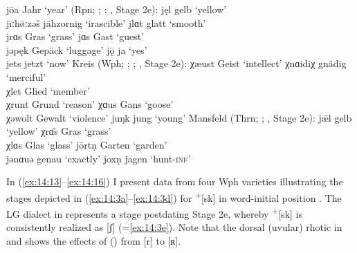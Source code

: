 \ex\label{ex:14:9d} jōa \tab [ʝoːɐ] \tab Jahr \tab ‘year’ 
\z
\ex%
\label{ex:14:10} (Rpn; \citealt{Bubner1935}; ; , Stage 2e):
\ea jęl \tab [ʝɛl] \tab gelb \tab ‘yellow’ \\\label{ex:14:10a}
    jīːh\={ø}ːzəš \tab [ʝiːhøːzəʃ] \tab jähzornig \tab ‘irascible’ 
\ex jlɑt \tab [ʝlɑt] \tab glatt \tab ‘smooth’ \\\label{ex:14:10b}
    jrɑs \tab [ʝrɑs] \tab Gras \tab ‘grass’ 
\ex jɑs \tab [ʝɑs] \tab Gast \tab ‘guest’ \\\label{ex:14:10c}
    jəpęk \tab [ʝəpɛk] \tab Gepäck \tab ‘luggage’ 
\ex jǭ \tab [ʝɔː] \tab ja \tab ‘yes’ \\\label{ex:14:10d}
    jets \tab [ʝets] \tab jetzt \tab ‘now’ 
\z
\ex%
\label{ex:14:11}Kreis  (Wph; \citealt{Hoffmann1887}; ; , Stage 2e):
\ea\label{ex:14:11a} χæust \tab [çæust] \tab Geist \tab ‘intellect’ 
\ex\label{ex:14:11b} χnɑidiχ \tab [çnɑidiç] \tab gnädig \tab ‘merciful’ \\
    χlet \tab [çlet] \tab Glied \tab ‘member’ \\
    χrunt \tab [çʀunt] \tab Grund \tab ‘reason’ 
\ex\label{ex:14:11c} χɑus \tab  [çɑus] \tab Gans \tab ‘goose’ \\
    χəwolt \tab [çəvolt] \tab Gewalt \tab ‘violence’ 
\ex\label{ex:14:11d}  juŋk \tab [ʝuŋk] \tab jung  \tab  ‘young’ 
    \z
\ex%
\label{ex:14:12}Mansfeld (Thrn; \citealt{Hennemann1901}; , Stage 2e):
\ea\label{ex:14:12a} j\={æ}l \tab [ʝæːl] \tab gelb \tab ‘yellow’ 
\ex\label{ex:14:12b} χrɑ̄s \tab [çʀɑːs] \tab Gras \tab ‘grass’ \\
    χlɑs \tab [çlɑt] \tab Glas \tab ‘glass’ 
\ex\label{ex:14:12c} jōrtṇ \tab [ʝoːʀtn̩] \tab Garten \tab ‘garden’ \\
    jənɑuə \tab [ʝənɑuə] \tab genau \tab ‘exactly’ 
\ex\label{ex:14:12d} joxṇ \tab [ʝoxn̩] \tab jagen \tab ‘hunt\textsc{{}-inf}’ 
\z
\z 

In (\ref{ex:14:13}--\ref{ex:14:16}) I present data from four Wph varieties illustrating the stages depicted in (\ref{ex:14:3a}--\ref{ex:14:3d}) for  \textsuperscript{+}[sk] in word-initial position \citep{Hall2021}. The LG dialect in  represents a stage postdating Stage 2e, whereby  \textsuperscript{+}[sk] is consistently realized as [ʃ] (=\ref{ex:14:3e}). Note that the dorsal (uvular) rhotic in  and  shows the effects of  () from [r] to [ʀ].

